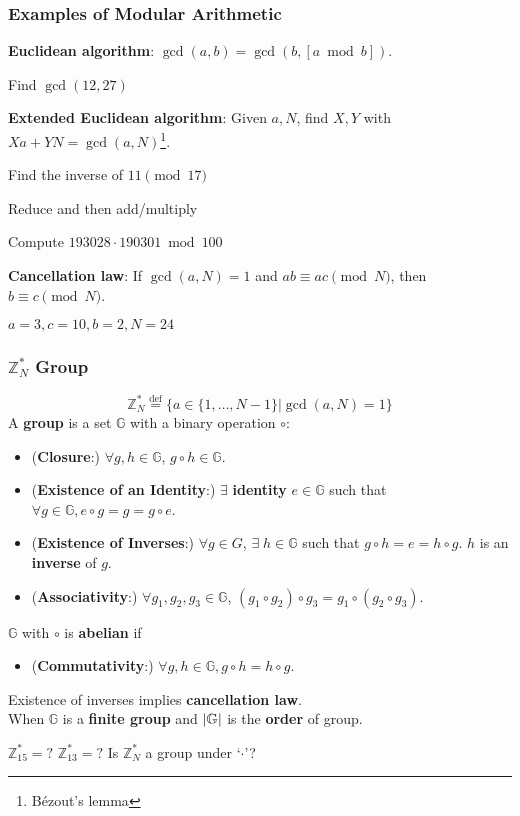 \begin{frame}\frametitle{Examples of Modular Arithmetic}
\textbf{Euclidean algorithm}: $\gcd(a,b) = \gcd(b, [a \bmod b]).$
\begin{exampleblock}{Find $\gcd(12, 27)$}
\end{exampleblock}
\textbf{Extended Euclidean algorithm}: Given $a,N$, find $X,Y$ with $Xa+YN = \gcd(a,N)$\footnote{B\'{e}zout's lemma}.
\begin{exampleblock}{Find the inverse of $11 \pmod {17}$}
\end{exampleblock}
Reduce and then add/multiply
\begin{exampleblock}{Compute $193028 \cdot 190301 \bmod 100$}
\end{exampleblock}
\textbf{Cancellation law}: If $\gcd(a,N)=1$ and $ab \equiv ac \pmod N$, then $b \equiv c \pmod N$.
\begin{exampleblock}{$a=3, c=10, b=2, N=24$}
\end{exampleblock}
\end{frame}
\begin{frame}\frametitle{$\mathbb{Z}_N^*$ Group}
\[ \mathbb{Z}_N^* \overset{\text{def}}{=} \{a \in \{1,\dotsc,N-1 \} | \gcd(a,N) = 1\} \]
A \textbf{group} is a set $\mathbb{G}$ with a binary operation $\circ$:
\begin{itemize}
\item (\textbf{Closure}:) $\forall g,h \in \mathbb{G}$, $g \circ h \in \mathbb{G}$.
\item (\textbf{Existence of an Identity}:) $\exists$ \textbf{identity} $e\in \mathbb{G}$ such that $\forall g\in \mathbb{G}, e \circ g = g = g \circ e$.
\item (\textbf{Existence of Inverses}:) $\forall g \in G$, $\exists\; h \in \mathbb{G}$ such that $g \circ h =e = h \circ g$. $h$ is an \textbf{inverse} of $g$.
\item (\textbf{Associativity}:) $\forall g_1,g_2,g_3 \in \mathbb{G}$, $(g_1\circ g_2)\circ g_3 = g_1 \circ (g_2 \circ g_3)$.
\end{itemize}
$\mathbb{G}$ with $\circ$ is \textbf{abelian} if
\begin{itemize}
\item (\textbf{Commutativity}:) $\forall g,h \in \mathbb{G}, g\circ h = h\circ g$.
\end{itemize}
Existence of inverses implies \textbf{cancellation law}.\\
When $\mathbb{G}$ is a \textbf{finite group} and $\lvert\mathbb{G}\rvert$ is the \textbf{order} of group.
\begin{exampleblock}{
$\mathbb{Z}_{15}^* = ?$ $\mathbb{Z}_{13}^* = ?$ Is $\mathbb{Z}_N^*$ a group under `$\cdot$'?}
\end{exampleblock}
\end{frame}
